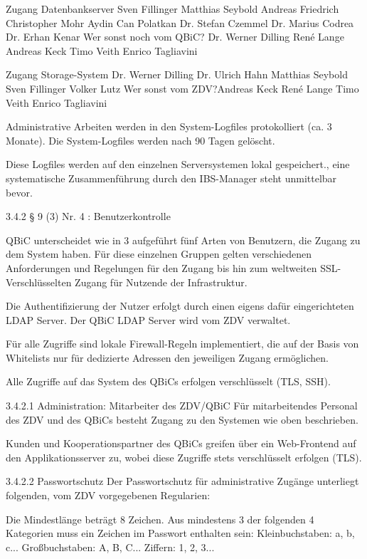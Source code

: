 \documentclass[]{scrreprt}
\begin{document}
Zugang Datenbankserver
Sven Fillinger
Matthias Seybold
Andreas Friedrich
Christopher Mohr
Aydin Can Polatkan
Dr. Stefan Czemmel
Dr. Marius Codrea
Dr. Erhan Kenar
Wer sonst noch vom QBiC?
Dr. Werner Dilling
René Lange
Andreas Keck
Timo Veith
Enrico Tagliavini


Zugang Storage-System
Dr. Werner Dilling
Dr. Ulrich Hahn
Matthias Seybold
Sven Fillinger
Volker Lutz
Wer sonst vom ZDV?Andreas Keck
René Lange
Timo Veith
Enrico Tagliavini	


Administrative Arbeiten werden in den System-Logfiles protokolliert (ca. 3 Monate).
Die System-Logfiles werden nach 90 Tagen gelöscht. 

Diese Logfiles werden auf den einzelnen Serversystemen lokal gespeichert., eine systematische Zusammenführung durch den IBS-Manager steht unmittelbar bevor.

3.4.2 § 9 (3) Nr. 4 : Benutzerkontrolle

QBiC unterscheidet wie in 3 aufgeführt fünf Arten von Benutzern, die Zugang zu dem System haben. Für diese einzelnen Gruppen gelten verschiedenen Anforderungen und Regelungen für den Zugang bis hin zum weltweiten SSL-Verschlüsselten Zugang für Nutzende der Infrastruktur.

Die Authentifizierung der Nutzer erfolgt durch einen eigens dafür eingerichteten LDAP Server. Der QBiC LDAP Server wird vom ZDV verwaltet.

Für alle Zugriffe sind lokale Firewall-Regeln implementiert, die auf der Basis von Whitelists nur für dedizierte Adressen den jeweiligen Zugang ermöglichen.

Alle Zugriffe auf das System des QBiCs erfolgen verschlüsselt (TLS, SSH).

3.4.2.1 Administration: Mitarbeiter des ZDV/QBiC
Für mitarbeitendes Personal des ZDV und des QBiCs besteht Zugang zu den Systemen wie oben beschrieben.

Kunden und Kooperationspartner des QBiCs greifen über ein Web-Frontend auf den Applikationsserver zu, wobei diese Zugriffe stets verschlüsselt erfolgen (TLS).

3.4.2.2 Passwortschutz
Der Passwortschutz für administrative Zugänge unterliegt folgenden, vom ZDV vorgegebenen Regularien:

Die Mindestlänge beträgt 8 Zeichen.
Aus mindestens 3 der folgenden 4 Kategorien muss ein Zeichen im Passwort enthalten sein:
Kleinbuchstaben: a, b, c...
Großbuchstaben: A, B, C...
Ziffern: 1, 2, 3...
\end{document}
